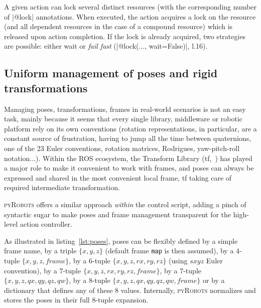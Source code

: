 \documentclass[a4paper, 10pt, conference]{ieeeconf}      %
\newcommand{\pyRobots}{\textsc{pyRobots}}
\begin{document}
A given action can lock several distinct resources (with the corresponding
number of \python|@lock| annotations. When executed, the
action acquires a lock on the resource (and all dependent resources in the case
of a compound resource) which is released upon action completion. If the lock is
already acquired, two strategies are possible: either wait or \emph{fail fast}
(\python|@lock(..., wait=False)|, l.16).


\subsection{Uniform management of poses and rigid transformations}

Managing poses, transformations, frames in real-world scenarios is not an easy
task, mainly because it seems that every single library, middleware or robotic
platform rely on its own conventions (rotation representations, in particular,
are a constant source of frustration, having to jump all the time between
quaternions, one of the 23 Euler conventions, rotation matrices, Rodrigues,
yaw-pitch-roll notation...). Within the ROS ecosystem, the Transform Library
(tf,~\cite{foote2013tf}) has played a major role to make it convenient to work
with frames, and poses can always be expressed and shared in the most convenient
local frame, tf taking care of required intermediate transformation.

\pyRobots{} offers a similar approach \emph{within} the control script, adding a
pinch of syntactic sugar to make poses and frame management transparent for the
high-level action controller.

As illustrated in listing~\ref{lst:poses}, poses can be flexibly defined by a
simple frame name, by a triple $\{x, y, z\}$ (default frame {\tt map} is then
assumed), by a 4-tuple $\{x, y, z, frame\}$, by a 6-tuple $\{x, y, z, rx, ry,
rz\}$ (using $sxyz$ Euler convention), by a 7-tuple $\{x, y, z, rx, ry, rz,
frame\}$, by a 7-tuple $\{x, y, z, qx, qy, qz, qw\}$, by a 8-tuple $\{x, y, z,
qx, qy, qz, qw, frame\}$ or by a dictionary that defines any of these 8 values.
Internally, \pyRobots{} normalizes and stores the poses in their full 8-tuple
expansion.
\end{document}
